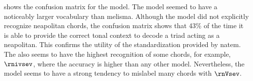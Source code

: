 
 shows the confusion
matrix for the \textcite{chen2021attend} model. The model
seemed to have a noticeably larger vocabulary than
\gls{melisma}. Although the model did not explicitly
recognize \gls{neapolitan} chords, the confusion matrix
shows that 43\% of the time it is able to provide the
correct tonal context to decode a triad acting as a
\gls{neapolitan}. This confirms the utility of the
standardization provided by \gls{natem}. The
\textcite{chen2021attend} also seems to have the highest
recognition of some chords, for example, $\rnivsev$, where
the accuracy is higher than any other model. Nevertheless,
the model seems to have a strong tendency to mislabel many
chords with $\rnVsev$.

